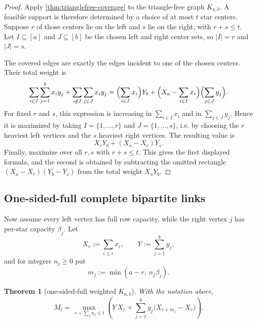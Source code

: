 \documentclass[11pt]{article}
\newtheorem{theorem}{Theorem}[section]
\theoremstyle{definition}
\begin{document}
\begin{proof}
Apply \cref{thm:trianglefree-coverage} to the triangle-free graph \(K_{a,b}\). A feasible support is therefore determined by a choice of at most \(t\) star centers. Suppose \(r\) of those centers lie on the left and \(s\) lie on the right, with \(r+s\le t\). Let \(I\subseteq [a]\) and \(J\subseteq [b]\) be the chosen left and right center sets, so \(|I|=r\) and \(|J|=s\).

The covered edges are exactly the edges incident to one of the chosen centers. Their total weight is
\[
\sum_{i\in I}\sum_{j=1}^b x_i y_j+\sum_{i\notin I}\sum_{j\in J} x_i y_j
=\Bigl(\sum_{i\in I}x_i\Bigr)Y_b+\Bigl(X_a-\sum_{i\in I}x_i\Bigr)\Bigl(\sum_{j\in J}y_j\Bigr).
\]
For fixed \(r\) and \(s\), this expression is increasing in \(\sum_{i\in I}x_i\) and in \(\sum_{j\in J}y_j\). Hence it is maximized by taking \(I=\{1,\dots,r\}\) and \(J=\{1,\dots,s\}\), i.e. by choosing the \(r\) heaviest left vertices and the \(s\) heaviest right vertices. The resulting value is
\[
X_rY_b+(X_a-X_r)Y_s.
\]
Finally, maximize over all \(r,s\) with \(r+s\le t\). This gives the first displayed formula, and the second is obtained by subtracting the omitted rectangle \((X_a-X_r)(Y_b-Y_s)\) from the total weight \(X_aY_b\).
\end{proof}

\subsection{One-sided-full complete bipartite links}
Now assume every left vertex has full row capacity, while the right vertex \(j\) has per-star capacity \(\beta_j\). Let
\[
X_r:=\sum_{i\le r}x_i,
\qquad Y:=\sum_{j=1}^b y_j,
\]
and for integers \(n_j\ge 0\) put
\[
m_j:=\min(a-r,\ n_j\beta_j).
\]

\begin{theorem}[one-sided-full weighted \(K_{a,b}\)]\label{thm:onesided-bip}
With the notation above,
\[
M_t=
\max_{\,r+\sum_j n_j\le t}
\left(
Y\,X_r+\sum_{j=1}^b y_j\bigl(X_{r+m_j}-X_r\bigr)
\right).
\]
\end{theorem}
\end{document}
